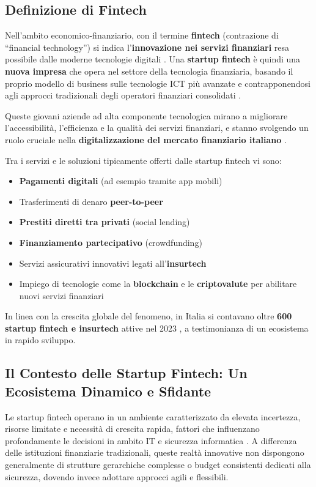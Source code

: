 \documentclass[a4paper,12pt]{report}
\begin{document}
\subsection{Definizione di Fintech}

Nell'ambito economico-finanziario, con il termine \textbf{fintech} (contrazione di ``financial technology'') si indica l'\textbf{innovazione nei servizi finanziari} resa possibile dalle moderne tecnologie digitali \cite{tecnofinanza}. Una \textbf{startup fintech} è quindi una \textbf{nuova impresa} che opera nel settore della tecnologia finanziaria, basando il proprio modello di business sulle tecnologie ICT più avanzate e contrapponendosi agli approcci tradizionali degli operatori finanziari consolidati \cite{fintech_numeri}. 

Queste giovani aziende ad alta componente tecnologica mirano a migliorare l'accessibilità, l'efficienza e la qualità dei servizi finanziari, e stanno svolgendo un ruolo cruciale nella \textbf{digitalizzazione del mercato finanziario italiano} \cite{tecnofinanza}. 

Tra i servizi e le soluzioni tipicamente offerti dalle startup fintech vi sono:
\begin{itemize}
    \item \textbf{Pagamenti digitali} (ad esempio tramite app mobili)
    \item Trasferimenti di denaro \textbf{peer-to-peer}
    \item \textbf{Prestiti diretti tra privati} (social lending)
    \item \textbf{Finanziamento partecipativo} (crowdfunding)
    \item Servizi assicurativi innovativi legati all'\textbf{insurtech}
    \item Impiego di tecnologie come la \textbf{blockchain} e le \textbf{criptovalute} per abilitare nuovi servizi finanziari
\end{itemize}

In linea con la crescita globale del fenomeno, in Italia si contavano oltre \textbf{600 startup fintech e insurtech} attive nel 2023 \cite{fintech_numeri}, a testimonianza di un ecosistema in rapido sviluppo.
\subsection{Il Contesto delle Startup Fintech: Un Ecosistema Dinamico e Sfidante}

Le startup fintech operano in un ambiente caratterizzato da elevata incertezza, risorse limitate e necessità di crescita rapida, fattori che influenzano profondamente le decisioni in ambito IT e sicurezza informatica \cite{fintechChallenges}. A differenza delle istituzioni finanziarie tradizionali, queste realtà innovative non dispongono generalmente di strutture gerarchiche complesse o budget consistenti dedicati alla sicurezza, dovendo invece adottare approcci agili e flessibili.
\end{document}
